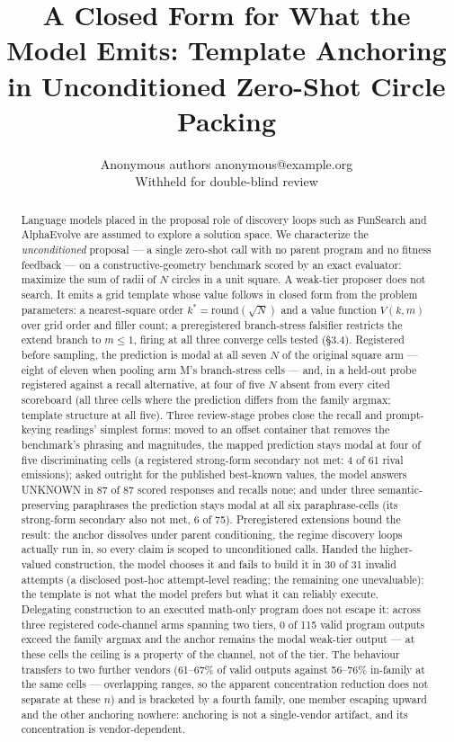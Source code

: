 \documentclass[10pt]{article}
\title{A Closed Form for What the Model Emits: Template Anchoring in
Unconditioned Zero-Shot Circle Packing}
\author{\name Anonymous authors \email anonymous@example.org \\
      \addr Withheld for double-blind review}
\begin{document}
\maketitle

\begin{abstract}
Language models placed in the proposal role of discovery loops such as FunSearch and
AlphaEvolve are assumed to explore a solution space. We characterize the
\emph{unconditioned} proposal --- a single zero-shot call with no parent program and no
fitness feedback --- on a constructive-geometry benchmark scored by an exact evaluator:
maximize the sum of radii of $N$ circles in a unit square. A weak-tier proposer does not
search. It emits a grid template whose value follows in closed form from the problem
parameters: a nearest-square order $k^* = \mathrm{round}(\sqrt{N})$ and a value function
$V(k, m)$ over grid order and filler count; a preregistered branch-stress falsifier restricts
the extend branch to $m \le 1$, firing at all three converge cells tested (\S3.4). Registered before sampling, the prediction is modal at all seven $N$ of the original
square arm --- eight of eleven when pooling arm M's branch-stress cells --- and, in a held-out probe registered against a recall alternative, at four of five
$N$ absent from every cited scoreboard (all three cells where the prediction differs from the family argmax; template structure at
all five). Three review-stage probes close the recall and prompt-keying readings' simplest forms: moved to an
offset container that removes the benchmark's phrasing and magnitudes, the mapped prediction
stays modal at four of five discriminating cells (a registered strong-form secondary not met:
4 of 61 rival emissions); asked outright for the published best-known values, the model
answers UNKNOWN in 87 of 87 scored responses and recalls none; and under three
semantic-preserving paraphrases the prediction stays modal at all six paraphrase-cells (its
strong-form secondary also not met, 6 of 75). Preregistered extensions bound the result: the anchor dissolves under parent
conditioning, the regime discovery loops actually run in, so every claim is scoped to
unconditioned calls. Handed the higher-valued construction, the model chooses it and fails to
build it in 30 of 31 invalid attempts (a disclosed post-hoc attempt-level reading; the remaining one unevaluable): the template is not what the model prefers but what it
can reliably execute. Delegating construction to an executed math-only program does not
escape it: across three registered code-channel arms spanning two tiers, 0 of 115 valid
program outputs exceed the family argmax and the anchor remains the modal weak-tier output
--- at these cells the ceiling is a property of the channel, not of the tier. The behaviour transfers to two
further vendors (61--67\% of valid outputs against 56--76\% in-family at the same cells ---
overlapping ranges, so the apparent concentration reduction does not separate at these $n$) and is bracketed by a fourth family, one member escaping upward and the other
anchoring nowhere: anchoring is not a single-vendor artifact, and its concentration is
vendor-dependent.
\end{abstract}
\end{document}
